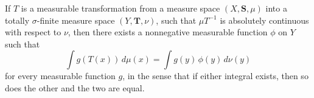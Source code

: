 If $T$ is a measurable transformation from a measure space $(X, \mathbf{S}, \mu)$ into a totally $\sigma$-finite measure space $(Y, \mathbf{T}, \nu)$, such that $\mu T^{-1}$ is absolutely continuous with respect to $\nu$, then there exists a nonnegative measurable function $\phi$ on $Y$ such that
$$\int g(T(x)) \, d\mu(x) = \int g(y) \, \phi(y) \, d\nu(y)$$
for every measurable function $g$, in the sense that if either integral exists, then so does the other and the two are equal.
